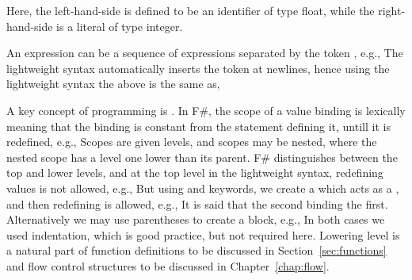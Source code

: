 %
%
%
Here, the left-hand-side is defined to be an identifier of type float, while the right-hand-side is a literal of type integer.

An expression can be a sequence of expressions separated by the token \token{;}, e.g.,
%
%
The lightweight syntax automatically inserts the \token{;} token at newlines, hence using the lightweight syntax the above is the same as,
%
%

A key concept of programming is . In F\#, the scope of a value binding is lexically meaning that the binding is constant from the  statement defining it, untill it is redefined, e.g.,
%
%
Scopes are given levels, and scopes may be nested, where the nested scope has a level one lower than its parent. F\# distinguishes between the top and lower levels, and at the top level in the lightweight syntax, redefining values is not allowed, e.g.,
%
%
But using  and  keywords, we create a  which acts as a , and then redefining is allowed, e.g.,
%
%
It is said that the second binding  the first.
Alternatively we may use parentheses to create a block, e.g.,
%
%
In both cases we used indentation, which is good practice, but not required here.  Lowering level is a natural part of function definitions to be discussed in Section~\ref{sec:functions} and flow control structures to be discussed in Chapter~\ref{chap:flow}.


